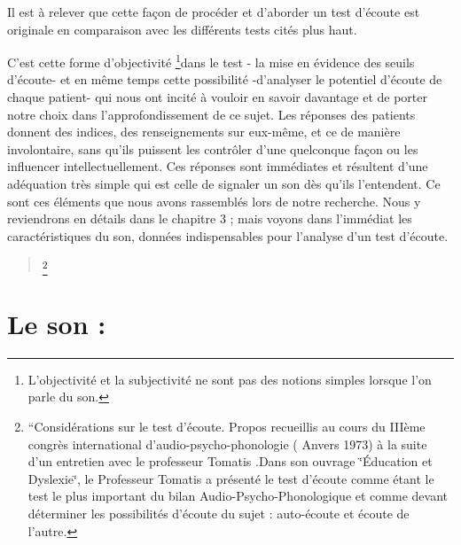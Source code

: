 \begin{itemize}
Il est à relever que cette façon de procéder et d'aborder un test
d'écoute est originale en comparaison avec les différents tests cités
plus haut.

C'est cette forme d'objectivité \footnote{L'objectivité et la subjectivité ne sont pas des notions simples lorsque
l'on parle du son.}dans le test - la mise en évidence des seuils d'écoute- et en même
temps cette possibilité -d'analyser le potentiel d'écoute de chaque
patient- qui nous ont incité à vouloir en savoir davantage et de porter
notre choix dans l'approfondissement de ce sujet. Les réponses des
patients donnent des indices, des renseignements sur eux-même, et
ce de manière involontaire, sans qu'ils puissent les contrôler d'une
quelconque façon ou les influencer intellectuellement. Ces réponses
sont immédiates et résultent d'une adéquation très simple qui est
celle de signaler un son dès qu'ils l'entendent. Ce sont ces éléments
que nous avons rassemblés lors de notre recherche. Nous y reviendrons
en détails dans le chapitre 3 ; mais voyons dans l'immédiat les caractéristiques
du son, données indispensables pour l'analyse d'un test d'écoute.
\begin{quote}
\footnote{``Considérations sur le test d'écoute. Propos recueillis au cours
du IIIème congrès international d'audio-psycho-phonologie ( Anvers
1973) à la suite d'un entretien avec le professeur Tomatis .Dans son
ouvrage \char`\"{}Éducation et Dyslexie\char`\"{}, le Professeur Tomatis
a présenté le test d'écoute comme étant le test le plus important
du bilan Audio-Psycho-Phonologique et comme devant déterminer les
possibilités d\textquoteright écoute du sujet : auto-écoute et écoute
de l'autre.}
\end{quote}

\section{Le son :}


\end{itemize}
